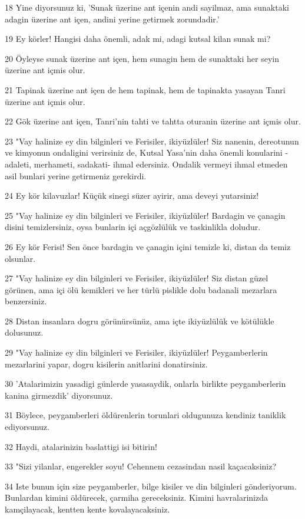 \par 18 Yine diyorsunuz ki, 'Sunak üzerine ant içenin andi sayilmaz, ama sunaktaki adagin üzerine ant içen, andini yerine getirmek zorundadir.'
\par 19 Ey körler! Hangisi daha önemli, adak mi, adagi kutsal kilan sunak mi?
\par 20 Öyleyse sunak üzerine ant içen, hem sunagin hem de sunaktaki her seyin üzerine ant içmis olur.
\par 21 Tapinak üzerine ant içen de hem tapinak, hem de tapinakta yasayan Tanri üzerine ant içmis olur.
\par 22 Gök üzerine ant içen, Tanri'nin tahti ve tahtta oturanin üzerine ant içmis olur.
\par 23 "Vay halinize ey din bilginleri ve Ferisiler, ikiyüzlüler! Siz nanenin, dereotunun ve kimyonun ondaligini verirsiniz de, Kutsal Yasa'nin daha önemli konularini -adaleti, merhameti, sadakati- ihmal edersiniz. Ondalik vermeyi ihmal etmeden asil bunlari yerine getirmeniz gerekirdi.
\par 24 Ey kör kilavuzlar! Küçük sinegi süzer ayirir, ama deveyi yutarsiniz!
\par 25 "Vay halinize ey din bilginleri ve Ferisiler, ikiyüzlüler! Bardagin ve çanagin disini temizlersiniz, oysa bunlarin içi açgözlülük ve taskinlikla doludur.
\par 26 Ey kör Ferisi! Sen önce bardagin ve çanagin içini temizle ki, distan da temiz olsunlar.
\par 27 "Vay halinize ey din bilginleri ve Ferisiler, ikiyüzlüler! Siz distan güzel görünen, ama içi ölü kemikleri ve her türlü pislikle dolu badanali mezarlara benzersiniz.
\par 28 Distan insanlara dogru görünürsünüz, ama içte ikiyüzlülük ve kötülükle dolusunuz.
\par 29 "Vay halinize ey din bilginleri ve Ferisiler, ikiyüzlüler! Peygamberlerin mezarlarini yapar, dogru kisilerin anitlarini donatirsiniz.
\par 30 'Atalarimizin yasadigi günlerde yasasaydik, onlarla birlikte peygamberlerin kanina girmezdik' diyorsunuz.
\par 31 Böylece, peygamberleri öldürenlerin torunlari oldugunuza kendiniz taniklik ediyorsunuz.
\par 32 Haydi, atalarinizin baslattigi isi bitirin!
\par 33 "Sizi yilanlar, engerekler soyu! Cehennem cezasindan nasil kaçacaksiniz?
\par 34 Iste bunun için size peygamberler, bilge kisiler ve din bilginleri gönderiyorum. Bunlardan kimini öldürecek, çarmiha gereceksiniz. Kimini havralarinizda kamçilayacak, kentten kente kovalayacaksiniz.
